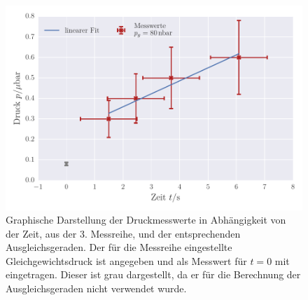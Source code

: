 \begin{figure}[!h]
 \centering
 \includegraphics[scale=0.8]{../Grafiken/Leckrate_Turbo_2.pdf}
 \caption{Graphische Darstellung der Druckmesswerte in Abhängigkeit von der Zeit, aus der 3. Messreihe, und der
 	entsprechenden Ausgleichsgeraden. Der für die Messreihe eingestellte Gleichgewichtsdruck ist angegeben und als Messwert für $t=0$ mit eingetragen. Dieser ist grau dargestellt, da er für die 
 	Berechnung der Ausgleichsgeraden nicht verwendet wurde.  \label{fig:leckrate_turbo_2}}
 \end{figure} 